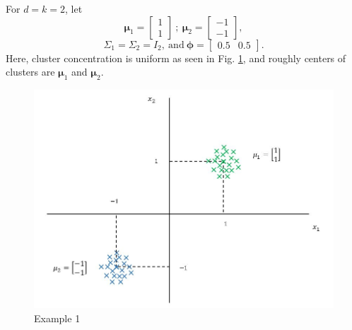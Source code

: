 \documentclass[a4paper,english,12pt]{article}
\begin{document}
\begin{exmp}\label{exmp:1}
For $d=k=2$, let 
\begin{equation*}
\boldsymbol{\mu}_1=\begin{bmatrix}
1\\
1
\end{bmatrix}
~;~ \boldsymbol{\mu}_2=\begin{bmatrix}
-1\\
-1
\end{bmatrix},
\end{equation*}
\begin{equation*}
\Sigma_1=\Sigma_2=I_2,~\mbox{and}~\pmb{\phi}=
\begin{bmatrix}
    0.5   &0.5
    \end{bmatrix}.
\end{equation*}
Here, cluster concentration is uniform as seen in Fig. \ref{fig:Example 1}, and roughly centers of clusters are $\boldsymbol{\mu}_1$ and $\boldsymbol{\mu}_2$.
\begin{figure}[h]
\centering
\includegraphics[width=0.9\linewidth]{Figures/Lect26fig1.jpg}
\caption[rdr]{Example 1}
\label{fig:Example 1}
\end{figure}
\end{exmp}
\end{document}
